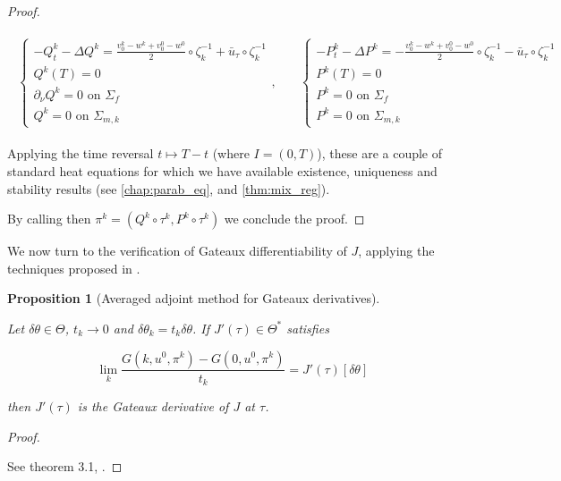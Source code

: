 \documentclass[english,a4paper,9pt,oneside]{scrbook}	%
\theoremstyle{break}
\newtheorem{prop}[equation]{Proposition}
\newenvironment{mproof}[1][\proofname]{%
  \begin{proof}[#1]$ $\par\nobreak\ignorespaces
}{%
  \end{proof}
}
\renewcommand*{\proofname}{Proof}
\theoremstyle{remark}
\newcommand{\te}{\theta}
\newcommand{\Te}{\Theta}
\begin{document}
\begin{mproof}
\begin{align*}
\begin{matrix}
\left\{\begin{matrix}
-Q^k_t-\Delta Q^k =\frac{v_0^k-w^k+v_0^0-w^0}{2}\circ \zeta_k^{-1}+\bar{u}_\tau\circ \zeta_k^{-1} \\
Q^k(T)=0\\
\partial_\nu Q^k = 0 \text{ on } \Sigma_f\\
Q^k = 0 \text{ on } \Sigma_{m,k}
\end{matrix}\right.
, \quad &
\left\{\begin{matrix}
-P^k_t-\Delta P^k =-\frac{v_0^k-w^k+v_0^0-w^0}{2}\circ \zeta_k^{-1}-\bar{u}_\tau\circ \zeta_k^{-1} \\
P^k(T)=0\\
P^k = 0 \text{ on } \Sigma_f\\
P^k = 0 \text{ on } \Sigma_{m,k}
\end{matrix}\right.
\end{matrix}
\end{align*}

Applying the time reversal $t\mapsto T -t$ (where $I = (0,T)$), these are a couple of standard heat equations for which we have available existence, uniqueness and stability results (see \cref{chap:parab_eq}, and \cref{thm:mix_reg}).

By calling then $\pi^k = (Q^k \circ \tau^k,P^k \circ \tau^k)$ we conclude the proof.
\end{mproof}

We now turn to the verification of Gateaux differentiability of $J$, applying the techniques proposed in \cite{avg_adj}.

\begin{prop}[Averaged adjoint method for Gateaux derivatives]
\label{prop:adv_adj}

Let $\delta \te \in \Te$, $t_k\rightarrow 0$ and $\delta\te_k = t_k\delta \te$. If $J'(\tau) \in \Te^*$ satisfies

$$\lim_{k}\frac{G(k,u^0,\pi^k)-G(0,u^0,\pi^k)}{t_k}=J'(\tau)[\delta \te]$$

then $J'(\tau)$ is the Gateaux derivative of $J$ at $\tau$.

\end{prop}

\begin{mproof}

See theorem 3.1, \cite{avg_adj}.
\end{mproof}
\end{document}

